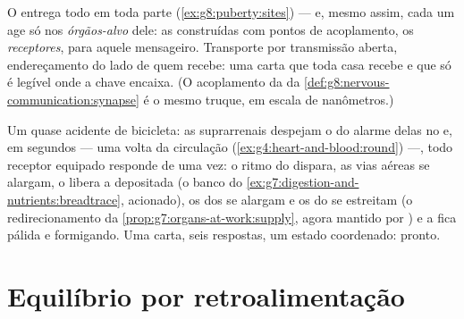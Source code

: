 \begin{proposition}\label{prop:g8:hormonal-communication:address}
O  entrega todo  em toda parte
(\cref{ex:g8:puberty:sites}) --- e, mesmo assim, cada um age só nos
\emph{órgãos-alvo} dele: as  construídas com
pontos de acoplamento, os \emph{receptores}, para aquele mensageiro.
Transporte por transmissão aberta, endereçamento do lado de quem
recebe: uma carta que toda casa recebe e que só é legível onde a chave
encaixa. (O acoplamento da  da
\cref{def:g8:nervous-communication:synapse} é o mesmo truque, em
escala de nanômetros.)
\end{proposition}
\admitted

\begin{example}\label{ex:g8:hormonal-communication:alarm}
Um quase acidente de bicicleta: as  suprarrenais despejam o
 do alarme delas no  e, em segundos --- uma volta da
circulação (\cref{ex:g4:heart-and-blood:round}) ---, todo receptor
equipado responde de uma vez: o ritmo do  dispara, as vias
aéreas se alargam, o  libera a  depositada (o banco do
\cref{ex:g7:digestion-and-nutrients:breadtrace}, acionado), os 
dos  se alargam e os do  se estreitam (o
redirecionamento da \cref{prop:g7:organs-at-work:supply}, agora
mantido por ) e a  fica pálida e formigando. Uma carta,
seis respostas, um estado coordenado: pronto.
\end{example}

\section{Equilíbrio por retroalimentação}

